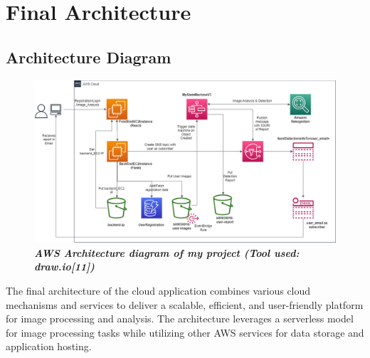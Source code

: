 
\newpage

\clearpage

\chapter{Final Architecture}
\section{Architecture Diagram}
\begin{figure}[htp]
    \centering
    \includegraphics[width=15.5cm]{Chapter_5/arch diag.drawio -v2.png}
    \caption{\textbf{\textit{AWS Architecture diagram of my project (Tool used: draw.io[11])}}}
    \label{fig:my_label}
\end{figure}
The final architecture of the cloud application combines various cloud mechanisms and services to deliver a scalable, efficient, and user-friendly platform for image processing and analysis. The architecture leverages a serverless model for image processing tasks while utilizing other AWS services for data storage and application hosting.

